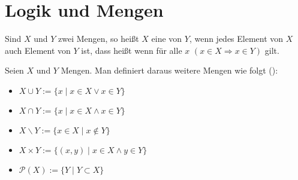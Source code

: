 \section{Logik und Mengen}

\begin{definition}[Teilmenge]
	Sind $X$ und $Y$ zwei Mengen, so heißt $X$ eine  von 
	$Y$, wenn jedes Element von $X$ auch Element von $Y$ ist, dass heißt wenn für alle 
	$x$ $(x \in X \Rightarrow x \in Y)$ gilt.
\end{definition}

\begin{definition}[Mengenoperationen]
	Seien $X$ und $Y$ Mengen. Man definiert daraus 
	weitere Mengen wie folgt ():
	\begin{itemize}
		\item $X \cup Y := \{x \mid x \in X \lor x \in Y\}$
		\item $X \cap Y := \{x \mid x \in X \land x \in Y\}$
		\item $X \backslash Y := \{x \in X \mid x \notin Y\}$
		\item $X \times Y := \{(x,y) \mid x \in X \land y \in Y\}$
		\item $\mathcal P(X) := \{Y \mid Y \subset X\}$
	\end{itemize}
\end{definition}
